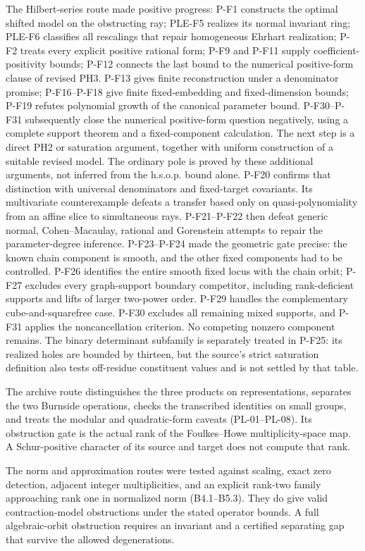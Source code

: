 The Hilbert-series route made positive progress: P-F1 constructs the
optimal shifted model on the obstructing ray; PLE-F5 realizes its normal
invariant ring; PLE-F6 classifies all rescalings that repair homogeneous
Ehrhart realization; P-F2 treats every explicit positive rational form;
P-F9 and P-F11 supply coefficient-positivity bounds; P-F12 connects the
last bound to the numerical positive-form clause of revised PH3.
P-F13 gives finite reconstruction under a denominator promise;
P-F16--P-F18 give finite fixed-embedding and fixed-dimension bounds;
P-F19 refutes polynomial growth of the canonical parameter bound.
P-F30--P-F31 subsequently close the numerical positive-form question
negatively, using a complete support theorem and a fixed-component
calculation. The next step is a direct PH2 or saturation argument,
together with uniform construction of a suitable revised model.
The ordinary pole is proved by these additional arguments, not
inferred from the h.s.o.p. bound alone.
P-F20 confirms that distinction with universal denominators and
fixed-target covariants. Its multivariate counterexample defeats a
transfer based only on quasi-polynomiality from an affine slice to
simultaneous rays. P-F21--P-F22 then defeat generic normal,
Cohen--Macaulay, rational and Gorenstein attempts to repair the
parameter-degree inference. P-F23--P-F24 made the geometric gate precise: the known chain
component is smooth, and the other fixed components had to be
controlled. P-F26 identifies the entire smooth fixed locus with
the chain orbit; P-F27 excludes every graph-support boundary
competitor, including rank-deficient supports and lifts of larger
two-power order. P-F29 handles the complementary cube-and-squarefree
case. P-F30 excludes all remaining mixed supports, and P-F31 applies
the noncancellation criterion. No competing nonzero component remains. The binary determinant subfamily is separately treated
in P-F25: its realized holes are bounded by thirteen, but the
source's strict saturation definition also tests off-residue
constituent values and is not settled by that table.

The archive route distinguishes the three products on representations,
separates the two Burnside operations, checks the transcribed identities
on small groups, and treats the modular and quadratic-form caveats
(PL-01--PL-08). Its obstruction gate is the actual rank of the
Foulkes--Howe multiplicity-space map. A Schur-positive character of its
source and target does not compute that rank.

The norm and approximation routes were tested against scaling, exact
zero detection, adjacent integer multiplicities, and an explicit rank-two
family approaching rank one in normalized norm (B4.1--B5.3). They do give
valid contraction-model obstructions under the stated operator bounds.
A full algebraic-orbit obstruction requires an invariant and a certified
separating gap that survive the allowed degenerations.

